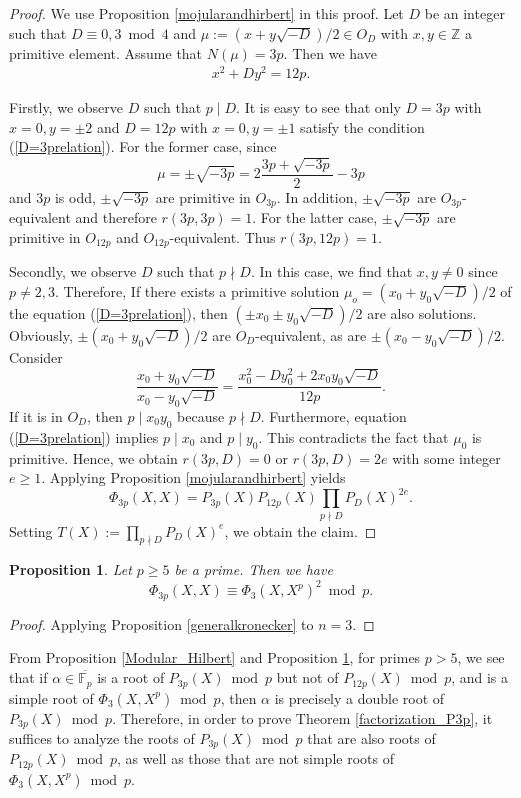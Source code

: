 \documentclass[a4paper, 11pt]{article}
\theoremstyle{plain}
\newtheorem{prop}[defn]{Proposition}
\newcommand{\?}{\textcolor{red}{??}}
\newcommand{\fp}{\mathbb{F}_p}
\newcommand{\bZ}{\mathbb{Z}}
\begin{document}
\begin{proof}
We use Proposition \ref{mojularandhirbert} in this proof. Let $D$ be an integer such that $D\equiv0,3 \bmod 4$ and $\mu:=(x+y\sqrt{-D})/2\in O_D$ with $x,y \in \bZ$  a primitive element.  Assume that $N(\mu)=3p$. Then we have
\begin{eqnarray}
\label{D=3prelation}
    x^2+Dy^2=12p.
\end{eqnarray}

Firstly, we observe $D$ such that $p\mid D$. It is easy to see that only $D=3p$ with $x=0,y=\pm2$ and $D=12p$ with $x=0,y=\pm1$ satisfy the condition (\ref{D=3prelation}). For the former case, since 
\[
\mu=\pm\sqrt{-3p}=2\frac{3p+\sqrt{-3p}}{2}-3p
\]
and $3p$ is odd, $\pm\sqrt{-3p}$ are primitive in $O_{3p}$. In addition, $\pm \sqrt{-3p}$ are $O_{3p}$-equivalent and therefore $r(3p,3p)=1$. For the latter case, $\pm\sqrt{-3p}$ are primitive in $O_{12p}$ and $O_{12p}$-equivalent. Thus $r(3p,12p)=1$.

Secondly, we observe $D$ such that $p\nmid D$. In this case, we find that $x,y\ne 0$ since $p\ne2,3$. Therefore, If there exists a primitive solution $\mu_o=(x_0+y_0\sqrt{-D})/2$ of the equation (\ref{D=3prelation}), then $(\pm x_0\pm y_0\sqrt{-D})/2$ are also solutions. Obviously, $\pm( x_0+ y_0\sqrt{-D})/2$ are $O_D$-equivalent, as are $\pm( x_0- y_0\sqrt{-D})/2$. Consider
\[
\frac{x_0+y_0\sqrt{-D}}{x_0-y_0\sqrt{-D}}=\frac{x_0^2-Dy_0^2+2x_0y_0\sqrt{-D}}{12p}.
\]
If it is in $O_{D}$, then $p\mid x_0y_0$ because $p \nmid D$.  Furthermore, equation (\ref{D=3prelation}) implies $p\mid x_0$ and $p\mid y_0$. This contradicts the fact that $\mu_0$ is primitive. Hence, we obtain $r(3p,D)=0$ or $r(3p,D)=2e$ with some integer $e\ge1$. Applying Proposition \ref{mojularandhirbert} yields
     \[
    \Phi_{3p}(X,X)=P_{3p}(X)P_{12p}(X) \prod_{p \nmid D }P_D(X)^{2e}.
    \]
    Setting $T(X):=\prod_{p \nmid D }P_D(X)^{e}$, we obtain the claim.    
\end{proof}


\begin{prop}
\label{3p_Kronecker}
Let $p \ge 5$ be a prime.  Then we have
    \[
    \Phi_{3p}(X,X)\equiv \Phi_3(X,X^p)^2 \bmod p. 
    \]
\end{prop}
\begin{proof}
    Applying Proposition \ref{generalkronecker} to $n=3$. 
\end{proof}

From Proposition \ref{Modular_Hilbert} and Proposition \ref{3p_Kronecker}, for primes $p > 5$, we see that if $\alpha \in \overline{\fp}$ is a root of $P_{3p}(X) \bmod p$ but not of $P_{12p}(X) \bmod p$, and is a simple root of $\Phi_3(X, X^p) \bmod p$, then $\alpha$ is precisely a double root of $P_{3p}(X) \bmod p$.
Therefore, in order to prove Theorem \ref{factorization_P3p}, it suffices to analyze the roots of $P_{3p}(X) \bmod p$ that are also roots of $P_{12p}(X) \bmod p$, as well as those that are not simple roots of $\Phi_3(X, X^p) \bmod p$.
\end{document}
